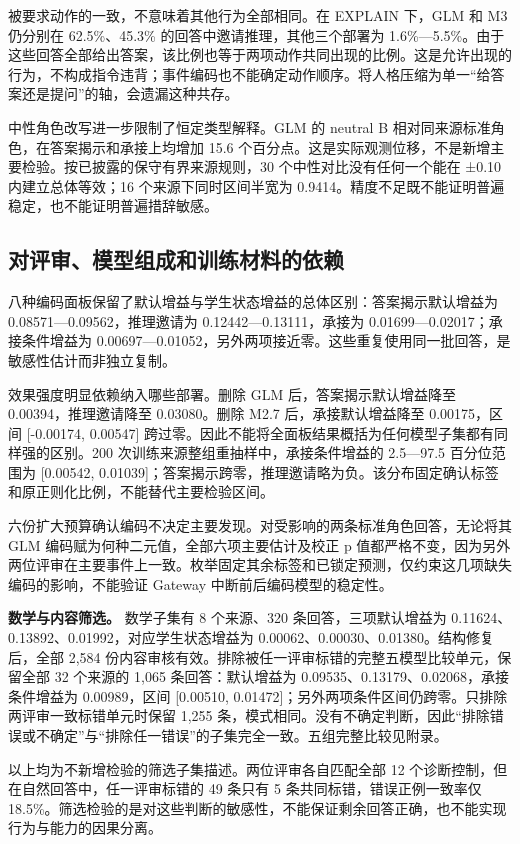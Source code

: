 \documentclass[11pt,a4paper,UTF8]{ctexart}
\begin{document}
被要求动作的一致，不意味着其他行为全部相同。在 EXPLAIN 下，GLM 和 M3 仍分别在 62.5\%、45.3\% 的回答中邀请推理，其他三个部署为 1.6\%—5.5\%。由于这些回答全部给出答案，该比例也等于两项动作共同出现的比例。这是允许出现的行为，不构成指令违背；事件编码也不能确定动作顺序。将人格压缩为单一“给答案还是提问”的轴，会遗漏这种共存。

中性角色改写进一步限制了恒定类型解释。GLM 的 neutral B 相对同来源标准角色，在答案揭示和承接上均增加 15.6 个百分点。这是实际观测位移，不是新增主要检验。按已披露的保守有界来源规则，30 个中性对比没有任何一个能在 ±0.10 内建立总体等效；16 个来源下同时区间半宽为 0.9414。精度不足既不能证明普遍稳定，也不能证明普遍措辞敏感。

\subsection{对评审、模型组成和训练材料的依赖}

八种编码面板保留了默认增益与学生状态增益的总体区别：答案揭示默认增益为 0.08571—0.09562，推理邀请为 0.12442—0.13111，承接为 0.01699—0.02017；承接条件增益为 0.00697—0.01052，另外两项接近零。这些重复使用同一批回答，是敏感性估计而非独立复制。

效果强度明显依赖纳入哪些部署。删除 GLM 后，答案揭示默认增益降至 0.00394，推理邀请降至 0.03080。删除 M2.7 后，承接默认增益降至 0.00175，区间 [-0.00174, 0.00547] 跨过零。因此不能将全面板结果概括为任何模型子集都有同样强的区别。200 次训练来源整组重抽样中，承接条件增益的 2.5—97.5 百分位范围为 [0.00542, 0.01039]；答案揭示跨零，推理邀请略为负。该分布固定确认标签和原正则化比例，不能替代主要检验区间。

六份扩大预算确认编码不决定主要发现。对受影响的两条标准角色回答，无论将其 GLM 编码赋为何种二元值，全部六项主要估计及校正 p 值都严格不变，因为另外两位评审在主要事件上一致。枚举固定其余标签和已锁定预测，仅约束这几项缺失编码的影响，不能验证 Gateway 中断前后编码模型的稳定性。

\textbf{数学与内容筛选。} 数学子集有 8 个来源、320 条回答，三项默认增益为 0.11624、0.13892、0.01992，对应学生状态增益为 0.00062、0.00030、0.01380。结构修复后，全部 2,584 份内容审核有效。排除被任一评审标错的完整五模型比较单元，保留全部 32 个来源的 1,065 条回答：默认增益为 0.09535、0.13179、0.02068，承接条件增益为 0.00989，区间 [0.00510, 0.01472]；另外两项条件区间仍跨零。只排除两评审一致标错单元时保留 1,255 条，模式相同。没有不确定判断，因此“排除错误或不确定”与“排除任一错误”的子集完全一致。五组完整比较见附录。

以上均为不新增检验的筛选子集描述。两位评审各自匹配全部 12 个诊断控制，但在自然回答中，任一评审标错的 49 条只有 5 条共同标错，错误正例一致率仅 18.5\%。筛选检验的是对这些判断的敏感性，不能保证剩余回答正确，也不能实现行为与能力的因果分离。
\end{document}
